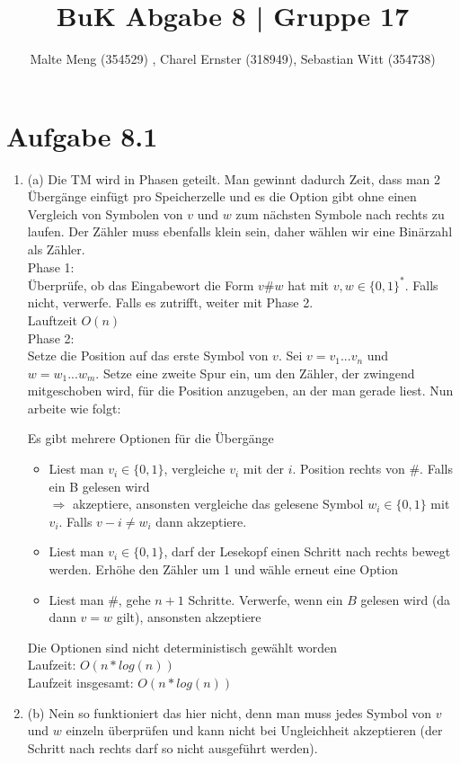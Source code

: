\documentclass{article}
\title{BuK Abgabe 8 | Gruppe 17}
\author{Malte Meng (354529) , Charel Ernster (318949), Sebastian Witt (354738)}
\begin{document}
	\maketitle 
	\section[a 8.1]{Aufgabe 8.1}
	\begin{enumerate}
		\item (a) Die TM wird in Phasen geteilt. Man gewinnt dadurch Zeit, dass man 2 Übergänge einfügt pro Speicherzelle und es die Option gibt ohne einen Vergleich von Symbolen von $v$ und $w$ zum nächsten Symbole nach rechts zu laufen. Der Zähler muss ebenfalls klein sein, daher wählen wir eine Binärzahl als Zähler.\\
		
		Phase 1:\\
		
		Überprüfe, ob das Eingabewort die Form $v \# w$ hat mit $v,w \in \{0,1\}^*$. Falls nicht, verwerfe. Falls es zutrifft, weiter mit Phase 2.\\
		Lauftzeit $O(n)$\\
		
		Phase 2:\\
		
		Setze die Position auf das erste Symbol von $v$. Sei $v=v_1...v_n$ und $w=w_1...w_m$. Setze eine zweite Spur ein, um den Zähler, der zwingend mitgeschoben wird, für die Position anzugeben, an der man gerade liest. Nun arbeite wie folgt:
		
		Es gibt mehrere Optionen für die Übergänge\\
		
		\begin{itemize}
			\item Liest man $v_i \in \{0,1\}$, vergleiche $v_i$ mit der $i$. Position rechts von $\#$. Falls ein B gelesen wird\\
			$\Rightarrow$ akzeptiere, ansonsten vergleiche das gelesene Symbol $w_i \in \{0,1\}$ mit $v_i$. Falls $v-i \neq w_i$ dann akzeptiere. 
			
			\item Liest man $v_i \in \{0,1\}$, darf der Lesekopf einen Schritt nach rechts bewegt werden. Erhöhe den Zähler um 1 und wähle erneut eine Option
			
			\item Liest man $\#$, gehe $n+1$ Schritte. Verwerfe, wenn ein $B$ gelesen wird (da dann $v=w$ gilt), ansonsten akzeptiere 
		\end{itemize}
		
		Die Optionen sind nicht deterministisch gewählt worden\\
		Laufzeit: $O(n*log(n))$\\
		Laufzeit insgesamt: $O(n*log(n))$ 
		
		\item (b) Nein so funktioniert das hier nicht, denn man muss jedes Symbol von $v$ und $w$ einzeln überprüfen und kann nicht bei Ungleichheit akzeptieren (der Schritt nach rechts darf so nicht ausgeführt werden).\\
	\end{enumerate}
\end{document}
